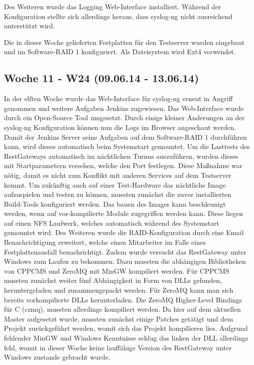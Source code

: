 \documentclass{article}
\begin{document}
Des Weiteren wurde das Logging Web-Interface installiert. Während der Konfiguration stellte sich allerdings heraus, dass syslog-ng nicht ausreichend unterstützt wird.

Die in dieser Woche gelieferten Festplatten für den Testserver wurden eingebaut und im Software-RAID 1 konfiguriert. Als Dateisystem wird Ext4 verwendet.

\subsection{Woche 11 - W24 (09.06.14 - 13.06.14)}

In der elften Woche wurde das Web-Interface für syslog-ng erneut in Angriff genommen und weitere Aufgaben Jenkins zugewiesen. Das Web-Interface wurde durch ein Open-Source Tool umgesetzt. Durch einige kleiner Änderungen an der syslog-ng Konfiguration können nun die Logs im Browser angeschaut werden.
Damit der Jenkins Server seine Aufgaben auf dem Software-RAID 1 durchführen kann, wird dieses automatisch beim Systemstart gemountet. Um die Lasttests des RestGateways automatisch im nächtlichen Turnus auszuführen, wurden dieses mit Startparametern versehen, welche den Port festlegen. Diese Maßnahme war nötig, damit es nicht zum Konflikt mit anderen Services auf dem Testserver kommt. Um zukünftig auch auf einer Test-Hardware das nächtliche Image aufzuspielen und testen zu können, mussten zunächst die zuvor installierten Build-Tools konfiguriert werden. Das bauen des Images kann beschleunigt werden, wenn auf vor-kompilierte Module zugegriffen werden kann. Diese liegen auf einen NFS Laufwerk, welches automatisch während des Systemstart gemountet wird.
Des Weiteren wurde die RAID-Konfiguration durch eine Email Benachrichtigung erweitert, welche einen Mitarbeiter im Falle eines Festplattenausfall benachrichtigt. Zudem wurde versucht das RestGateway unter Windows zum Laufen zu bekommen. Dazu mussten die abhängigen Bibliotheken von CPPCMS und ZeroMQ mit MinGW kompiliert werden. Für CPPCMS mussten zunächst weiter fünf Abhängigkeit in Form von DLLs gefunden, heruntergeladen und zusammengepackt werden. Für ZeroMQ kann man sich bereits vorkompilierte  DLLs herunterladen. Die ZeroMQ Higher-Level Bindings für C (czmq), mussten allerdings kompiliert werden. Da hier auf dem aktuellen Master aufgesetzt wurde, mussten zunächst einige Patches getätigt und dem Projekt zurückgeführt werden, womit sich das Projekt kompilieren lies. Aufgrund fehlender MinGW und Windows Kenntnisse schlug das linken der DLL allerdings fehl, womit in dieser Woche keine lauffähige Version des RestGateway unter Windows zustande gebracht wurde.
\end{document}
